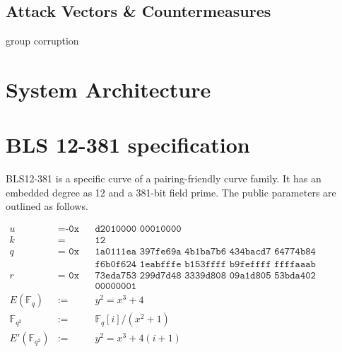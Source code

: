 \documentclass[11pt]{article}
\begin{document}
\subsection{Attack Vectors \& Countermeasures}

group corruption


\section{System Architecture}



\appendix
\section{BLS 12-381 specification}
BLS12-381 is a specific curve of a pairing-friendly curve family. It has an embedded degree as 12 and a 381-bit field prime. The public parameters are outlined as follows\cite{bls12381spec}.

\begin{align*}
u &= \texttt{-0x} && \texttt{d2010000 00010000} \\
k &= &&\texttt{12} \\
q &= \texttt{ 0x} && \texttt{1a0111ea 397fe69a 4b1ba7b6 434bacd7 64774b84 f38512bf 6730d2a0} \\
& && \texttt{f6b0f624 1eabfffe b153ffff b9feffff ffffaaab} \\
r &= \texttt{ 0x} && \texttt{73eda753 299d7d48 3339d808 09a1d805 53bda402 fffe5bfe ffffffff}\\
& && \texttt{00000001} \\
E(\mathbb{F}_q) &:= &&y^2 = x^3 + 4 \\
\mathbb{F}_{q^2} &:= &&\mathbb{F}_q[i]/(x^2 + 1) \\
E'(\mathbb{F}_{q^2}) &:= &&y^2 = x^3 + 4(i + 1) \\
\end{align*}



\end{document}
